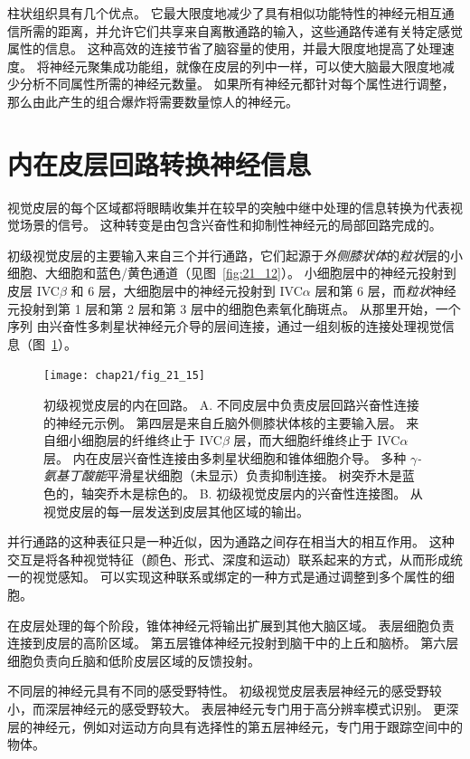 柱状组织具有几个优点。
它最大限度地减少了具有相似功能特性的神经元相互通信所需的距离，并允许它们共享来自离散通路的输入，这些通路传递有关特定感觉属性的信息。
这种高效的连接节省了脑容量的使用，并最大限度地提高了处理速度。
将神经元聚集成功能组，就像在皮层的列中一样，可以使大脑最大限度地减少分析不同属性所需的神经元数量。
如果所有神经元都针对每个属性进行调整，那么由此产生的组合爆炸将需要数量惊人的神经元。



\section{内在皮层回路转换神经信息}

视觉皮层的每个区域都将眼睛收集并在较早的突触中继中处理的信息转换为代表视觉场景的信号。
这种转变是由包含兴奋性和抑制性神经元的局部回路完成的。


初级视觉皮层的主要输入来自三个并行通路，它们起源于\textit{外侧膝状体}的\textit{粒状}层的小细胞、大细胞和蓝色/黄色通道（见图~\ref{fig:21_12}）。
小细胞层中的神经元投射到皮层 IVC$\beta$ 和 6 层，大细胞层中的神经元投射到 IVC$\alpha$ 层和第 6 层，而\textit{粒状}神经元投射到第 1 层和第 2 层和第 3 层中的细胞色素氧化酶斑点。
从那里开始，一个序列 由兴奋性多刺星状神经元介导的层间连接，通过一组刻板的连接处理视觉信息（图~\ref{fig:21_15}）。


\begin{figure}[htbp]
	\centering
	\texttt{[image: chap21/fig\_21\_15]}
	\caption{初级视觉皮层的内在回路。
		A. 不同皮层中负责皮层回路兴奋性连接的神经元示例。 
		第四层是来自丘脑外侧膝状体核的主要输入层。 
		来自细小细胞层的纤维终止于 IVC$\beta$ 层，而大细胞纤维终止于 IVC$\alpha$ 层。 
		内在皮层兴奋性连接由多刺星状细胞和锥体细胞介导。 
		多种 \textit{$\gamma$-氨基丁酸能}平滑星状细胞（未显示）负责抑制连接。 
		树突乔木是蓝色的，轴突乔木是棕色的\cite{blasdel1983termination}。
		B. 初级视觉皮层内的兴奋性连接图。
		从视觉皮层的每一层发送到皮层其他区域的输出。}
	\label{fig:21_15}
\end{figure}


并行通路的这种表征只是一种近似，因为通路之间存在相当大的相互作用。
这种交互是将各种视觉特征（颜色、形式、深度和运动）联系起来的方式，从而形成统一的视觉感知。
可以实现这种联系或绑定的一种方式是通过调整到多个属性的细胞。


在皮层处理的每个阶段，锥体神经元将输出扩展到其他大脑区域。
表层细胞负责连接到皮层的高阶区域。
第五层锥体神经元投射到脑干中的上丘和脑桥。
第六层细胞负责向丘脑和低阶皮层区域的反馈投射。


不同层的神经元具有不同的感受野特性。
初级视觉皮层表层神经元的感受野较小，而深层神经元的感受野较大。
表层神经元专门用于高分辨率模式识别。 
更深层的神经元，例如对运动方向具有选择性的第五层神经元，专门用于跟踪空间中的物体。


